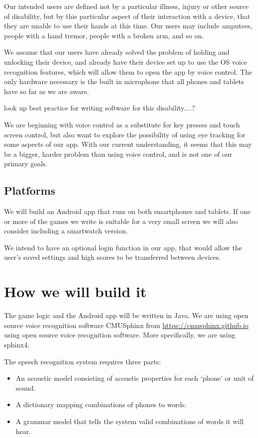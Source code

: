 \documentclass[11pt, oneside]{article}
\begin{document}
Our intended users are defined not by a particular illness, injury
or other source of disability, but by this particular aspect of their
interaction with a device, that they are unable to use their hands at
this time. Our users may include amputees, people with a hand tremor,
people with a broken arm, and so on.

We assume that our users have already solved the problem of holding and unlocking their device, and already have their device set up to use the OS voice recognition features, which will allow them to open the app by voice control. The only hardware necessary is the built in microphone that all phones and tablets have so far as we are aware.


look up best practice for writing software for this disability....?

We are beginning with voice control as a substitute for key presses
and touch screen control, but also want to explore the possibility of
using eye tracking for some aspects of our app. With our current
understanding, it seems that this may be a bigger, harder problem
than using voice control, and is not one of our primary goals.


\subsection*{Platforms}

We will build an Android app that runs on both smartphones and
tablets. If one or more of the games we write is suitable for a very
small screen we will also consider including a smartwatch version.

We intend to have an optional login function in our app, that would
allow the user's saved settings and high scores to be transferred between
devices.


\section*{How we will build it}

The game logic and the Android app will be written in Java. We are using open source voice recognition software CMUSphinx from \url{https://cmusphinx.github.io} using open source voice recognition software. More specifically, we are using sphinx4.

The speech recognition system requires three parts:
\begin{itemize}
\item An acoustic model consisting of acoustic properties for each `phone' or unit of sound.
\item A dictionary mapping combinations of phones to words.
\item A grammar model that tells the system valid combinations of words it will hear.
\end{itemize}
\end{document}
